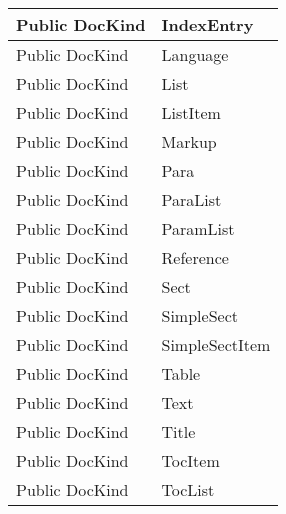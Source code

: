 \documentclass[11pt, oneside, a4paper]{book}
\begin{document}
\begin{center}
\begin{tabular}{| p{3cm} | p{12cm} | }
\hline
 Public  DocKind &  IndexEntry\hypertarget{SoftwareEngineeringTools.{}Documentation.{}DocKind.{}IndexEntry}{}\\
\hline
 Public  DocKind &  Language\hypertarget{SoftwareEngineeringTools.{}Documentation.{}DocKind.{}Language}{}\\
\hline
 Public  DocKind &  List\hypertarget{SoftwareEngineeringTools.{}Documentation.{}DocKind.{}List}{}\\
\hline
 Public  DocKind &  ListItem\hypertarget{SoftwareEngineeringTools.{}Documentation.{}DocKind.{}ListItem}{}\\
\hline
 Public  DocKind &  Markup\hypertarget{SoftwareEngineeringTools.{}Documentation.{}DocKind.{}Markup}{}\\
\hline
 Public  DocKind &  Para\hypertarget{SoftwareEngineeringTools.{}Documentation.{}DocKind.{}Para}{}\\
\hline
 Public  DocKind &  ParaList\hypertarget{SoftwareEngineeringTools.{}Documentation.{}DocKind.{}ParaList}{}\\
\hline
 Public  DocKind &  ParamList\hypertarget{SoftwareEngineeringTools.{}Documentation.{}DocKind.{}ParamList}{}\\
\hline
 Public  DocKind &  Reference\hypertarget{SoftwareEngineeringTools.{}Documentation.{}DocKind.{}Reference}{}\\
\hline
 Public  DocKind &  Sect\hypertarget{SoftwareEngineeringTools.{}Documentation.{}DocKind.{}Sect}{}\\
\hline
 Public  DocKind &  SimpleSect\hypertarget{SoftwareEngineeringTools.{}Documentation.{}DocKind.{}SimpleSect}{}\\
\hline
 Public  DocKind &  SimpleSectItem\hypertarget{SoftwareEngineeringTools.{}Documentation.{}DocKind.{}SimpleSectItem}{}\\
\hline
 Public  DocKind &  Table\hypertarget{SoftwareEngineeringTools.{}Documentation.{}DocKind.{}Table}{}\\
\hline
 Public  DocKind &  Text\hypertarget{SoftwareEngineeringTools.{}Documentation.{}DocKind.{}Text}{}\\
\hline
 Public  DocKind &  Title\hypertarget{SoftwareEngineeringTools.{}Documentation.{}DocKind.{}Title}{}\\
\hline
 Public  DocKind &  TocItem\hypertarget{SoftwareEngineeringTools.{}Documentation.{}DocKind.{}TocItem}{}\\
\hline
 Public  DocKind &  TocList\hypertarget{SoftwareEngineeringTools.{}Documentation.{}DocKind.{}TocList}{}\\

\end{tabular}
\end{center}
\end{document}
